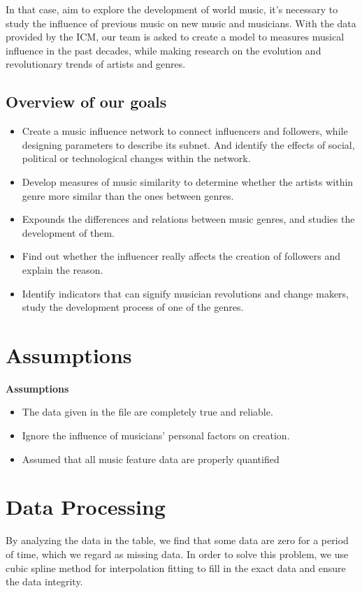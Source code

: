 \documentclass{mcmthesis}
\begin{document}
In that case, aim to explore the development of world music, it's necessary to study the influence of previous music on new music and musicians. With the data provided by the ICM, our team is asked to create a model to measures musical influence in the past decades, while making research on the evolution and revolutionary trends of artists and genres.


\subsection{Overview of our goals}
\begin{itemize}
	\item Create a music influence network to connect influencers and followers, while designing parameters to describe its subnet. And identify the effects of social, political or technological 
	changes within the network.
	\item Develop measures of music similarity to determine whether the artists within genre more similar than the ones between genres.
	\item Expounds the differences and relations between music genres, and studies the development of them.
	\item Find out whether the influencer really affects the creation of followers and explain the reason. 
	\item Identify indicators that can signify musician revolutions and change makers, study the development process of one of the genres.
\end{itemize}
\section{Assumptions}
\noindent%
\textbf{Assumptions}

\begin{itemize}
	\item The data given in the file are completely true and reliable.
	\item Ignore the influence of musicians' personal factors on creation.
	\item Assumed that all music feature data are properly quantified
\end{itemize}
\section{Data Processing}
By analyzing the data in the table, we find that some data are zero for a period of time, which we regard as missing data. In order to solve this problem, we use cubic spline method for interpolation fitting to fill in the exact data and ensure the data integrity.
\end{document}

